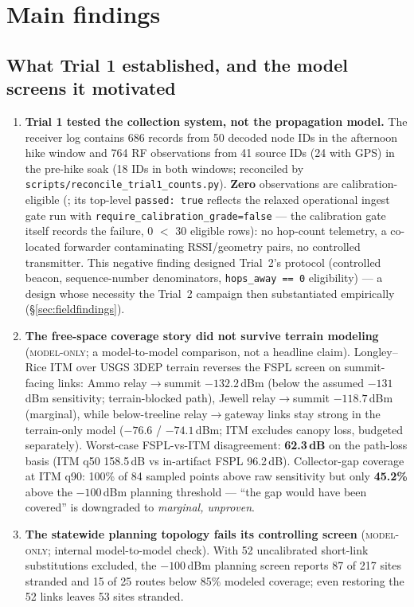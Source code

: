 \documentclass[11pt]{article}
\newcommand{\modelonly}{\textsc{model-only}}
\newcommand{\code}[1]{\texttt{\small #1}}
\begin{document}
\section{Main findings}\label{sec:findings}

\subsection{What Trial 1 established, and the model screens it motivated}\label{sec:trial1}

\begin{enumerate}
\item \textbf{Trial 1 tested the collection system, not the propagation
model.} The receiver log contains 686 records from 50 decoded node IDs in
the afternoon hike window and 764 RF observations from 41 source IDs (24
with GPS) in the pre-hike soak (18 IDs in both windows; reconciled by
\code{scripts/reconcile\_trial1\_counts.py}). \textbf{Zero} observations are
calibration-eligible (;
its top-level \code{passed:\,true} reflects the relaxed operational ingest
gate run with \code{require\_calibration\_grade=false} --- the calibration
gate itself records the failure, 0 $<$ 30 eligible rows): no hop-count
telemetry, a co-located forwarder contaminating RSSI/geometry pairs, no
controlled transmitter. This negative finding designed Trial~2's protocol
(controlled beacon, sequence-number denominators, \code{hops\_away == 0}
eligibility) --- a design whose necessity the Trial~2 campaign then substantiated empirically (\S\ref{sec:fieldfindings}).
\item \textbf{The free-space coverage story did not survive terrain modeling}
(\modelonly{}; a model-to-model comparison, not a headline claim).
Longley--Rice ITM over USGS 3DEP terrain reverses the FSPL screen on
summit-facing links: Ammo relay$\to$summit $-132.2$\,dBm (below the assumed
$-131$\,dBm sensitivity; terrain-blocked path), Jewell relay$\to$summit
$-118.7$\,dBm (marginal), while below-treeline relay$\to$gateway links stay
strong in the terrain-only model ($-76.6$ / $-74.1$\,dBm; ITM excludes canopy
loss, budgeted separately). Worst-case FSPL-vs-ITM disagreement:
\textbf{62.3\,dB} on the path-loss basis (ITM q50 158.5\,dB vs in-artifact
FSPL 96.2\,dB). Collector-gap coverage at ITM q90: 100\% of 84 sampled points
above raw sensitivity but only \textbf{45.2\%} above the $-100$\,dBm planning
threshold --- ``the gap would have been covered'' is downgraded to
\emph{marginal, unproven}.
\item \textbf{The statewide planning topology fails its controlling screen}
(\modelonly{}; internal model-to-model check). With 52 uncalibrated
short-link substitutions excluded, the $-100$\,dBm planning screen reports 87
of 217 sites stranded and 15 of 25 routes below 85\% modeled coverage; even
restoring the 52 links leaves 53 sites stranded.
\end{enumerate}
\end{document}

